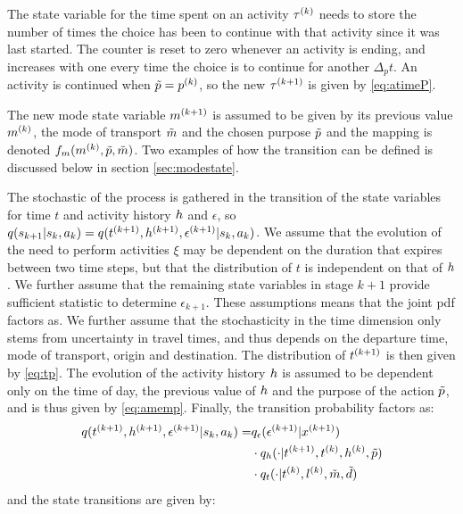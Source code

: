 The state variable for the time spent on an activity $\tau^{(k)}$ needs to store the number of times the choice has been to continue with that activity since it was last started. The counter is reset to zero whenever an activity is ending, and increases with one every time the choice is to continue for another $\Delta_p t$. An activity is continued when $\tilde{p} = p^{(k)}$, so the new $\tau^{(k+1)}$ is given by \eqref{eq:atimeP}.

The new mode state variable $m^{(k+1)}$ is assumed to be given by its previous value $m^{(k)}$, the mode of transport $\tilde{m}$ and the chosen purpose $\tilde{p}$ and the mapping is denoted $f_m(m^{(k)},\tilde{p},\tilde{m})$. Two examples of how the transition can be defined is discussed below in section \ref{sec:modestate}.

The stochastic of the process is gathered in the transition of the state variables for time $t$ and activity history $h$ and $\epsilon$, so $q(s_{k+1}|s_{k},a_k) = q(t^{(k+1)},h^{(k+1)},\epsilon^{(k+1)}| s_{k},a_k)$. We assume that the evolution of the need to perform activities $\xi$ may be dependent on the duration that expires between two time steps, but that the distribution of $t$ is independent on that of $h$. We further assume that the remaining state variables in stage $k+1$ provide sufficient statistic to determine $\epsilon_{k+1}$. These assumptions means that the joint pdf factors as. We further assume that the stochasticity in the time dimension only stems from uncertainty in travel times, and thus depends on the departure time, mode of transport, origin and destination. The distribution of $t^{(k+1)}$ is then given by \eqref{eq:tp}. The evolution of the activity history $h$ is assumed to be dependent only on the time of day, the previous value of $h$ and the purpose of the action $\tilde{p}$, and is thus given by \eqref{eq:amemp}. Finally, the transition probability factors as:
\begin{equation}
\begin{aligned}
	 q(t\ks{k+1},\amem\ks{k+1},\epsilon\ks{k+1}| \s{k},a_k) = & q_\epsilon(\epsilon\ks{k+1}|x\ks{k+1}) \\ &\cdot q_\amem(\cdot | t\ks{k+1},t\ks{k}, \amem\ks{k},\act{p})\\&\cdot q_t (\cdot | t\ks{k},l\ks{k},\act{m},\act{d})
\end{aligned}
\end{equation}
and the state transitions are given by:
